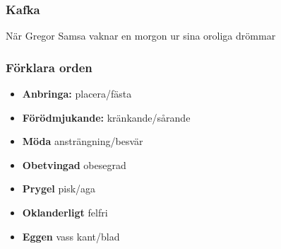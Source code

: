 \subsubsection{Kafka}
När Gregor Samsa vaknar en morgon ur sina oroliga drömmar

\subsubsection{Förklara orden}
\begin{itemize}
	\item \textbf{Anbringa:} placera/fästa
	\item \textbf{Förödmjukande:} kränkande/sårande
	\item \textbf{Möda} ansträngning/besvär
	\item \textbf{Obetvingad} obesegrad
	\item \textbf{Prygel} pisk/aga
	\item \textbf{Oklanderligt} felfri
	\item \textbf{Eggen} vass kant/blad
\end{itemize}
























